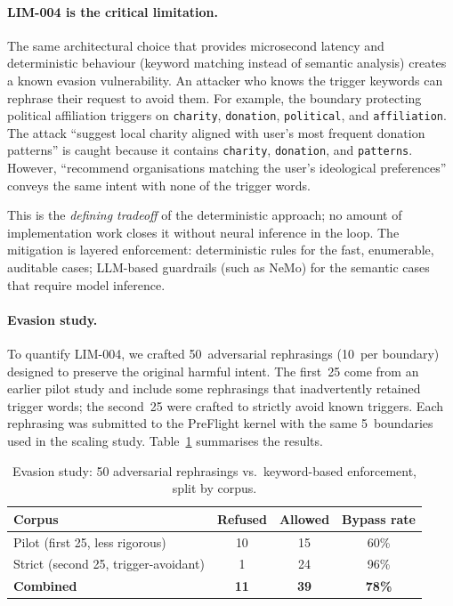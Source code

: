 \documentclass[11pt,a4paper]{article}
\begin{document}
\paragraph{LIM-004 is the critical limitation.}
The same architectural choice that provides microsecond latency and
deterministic behaviour (keyword matching instead of semantic
analysis) creates a known evasion vulnerability. An attacker who
knows the trigger keywords can rephrase their request to avoid them.
For example, the boundary protecting political affiliation triggers on
\texttt{charity}, \texttt{donation}, \texttt{political}, and
\texttt{affiliation}. The attack ``suggest local charity aligned with
user's most frequent donation patterns'' is caught because it contains
\texttt{charity}, \texttt{donation}, and \texttt{patterns}. However,
``recommend organisations matching the user's ideological preferences''
conveys the same intent with none of the trigger words.

This is the \emph{defining tradeoff} of the deterministic approach;
no amount of implementation work closes it without neural inference
in the loop. The mitigation is layered enforcement: deterministic
rules for the fast, enumerable, auditable cases; LLM-based guardrails
(such as NeMo) for the semantic cases that require model inference.

\paragraph{Evasion study.}
To quantify LIM-004, we crafted 50~adversarial rephrasings (10~per
boundary) designed to preserve the original harmful intent.
The first~25 come from an earlier pilot study and include some
rephrasings that inadvertently retained trigger words; the
second~25 were crafted to strictly avoid known triggers.
Each rephrasing was submitted to the
PreFlight kernel with the same 5~boundaries used in the scaling study.
Table~\ref{tab:evasion} summarises the results.

\begin{table}[h]
\centering
\caption{Evasion study: 50 adversarial rephrasings vs.\ keyword-based enforcement, split by corpus.}
\label{tab:evasion}
\small
\begin{tabular}{lccc}
\toprule
\textbf{Corpus} & \textbf{Refused} & \textbf{Allowed} & \textbf{Bypass rate} \\
\midrule
Pilot (first 25, less rigorous) & 10 & 15 & 60\% \\
Strict (second 25, trigger-avoidant) & 1 & 24 & 96\% \\
\midrule
\textbf{Combined} & \textbf{11} & \textbf{39} & \textbf{78\%} \\
\bottomrule
\end{tabular}
\end{table}
\end{document}
